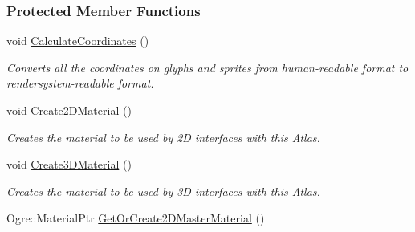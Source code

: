 \subsubsection*{Protected Member Functions}
\begin{DoxyCompactItemize}
\item 
\hypertarget{classMezzanine_1_1UI_1_1TextureAtlas_a47de8c779dbddd923a69bb076bcd6334}{
void \hyperlink{classMezzanine_1_1UI_1_1TextureAtlas_a47de8c779dbddd923a69bb076bcd6334}{CalculateCoordinates} ()}
\label{classMezzanine_1_1UI_1_1TextureAtlas_a47de8c779dbddd923a69bb076bcd6334}

\begin{DoxyCompactList}\small\item\em Converts all the coordinates on glyphs and sprites from human-\/readable format to rendersystem-\/readable format. \item\end{DoxyCompactList}\item 
\hypertarget{classMezzanine_1_1UI_1_1TextureAtlas_a25c8200b4e950aa1bc4a7aaaab1c9915}{
void \hyperlink{classMezzanine_1_1UI_1_1TextureAtlas_a25c8200b4e950aa1bc4a7aaaab1c9915}{Create2DMaterial} ()}
\label{classMezzanine_1_1UI_1_1TextureAtlas_a25c8200b4e950aa1bc4a7aaaab1c9915}

\begin{DoxyCompactList}\small\item\em Creates the material to be used by 2D interfaces with this Atlas. \item\end{DoxyCompactList}\item 
\hypertarget{classMezzanine_1_1UI_1_1TextureAtlas_a27bc91d153b1ade917477ec7c93099f0}{
void \hyperlink{classMezzanine_1_1UI_1_1TextureAtlas_a27bc91d153b1ade917477ec7c93099f0}{Create3DMaterial} ()}
\label{classMezzanine_1_1UI_1_1TextureAtlas_a27bc91d153b1ade917477ec7c93099f0}

\begin{DoxyCompactList}\small\item\em Creates the material to be used by 3D interfaces with this Atlas. \item\end{DoxyCompactList}\item 
\hypertarget{classMezzanine_1_1UI_1_1TextureAtlas_a237e8ed844ed7947a288bde797adacc0}{
Ogre::MaterialPtr \hyperlink{classMezzanine_1_1UI_1_1TextureAtlas_a237e8ed844ed7947a288bde797adacc0}{GetOrCreate2DMasterMaterial} ()}
\label{classMezzanine_1_1UI_1_1TextureAtlas_a237e8ed844ed7947a288bde797adacc0}


\end{DoxyCompactItemize}
